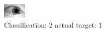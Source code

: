 \begin{figure}[h!]
\begin{center}
\includegraphics[width=0.60\columnwidth]{figures/ID1530_class_2_target_1.png}
\end{center}
\caption{ Classification: 2 actual target: 1}
\label{fig:ID1530_class_2_target_1}
\end{figure}
